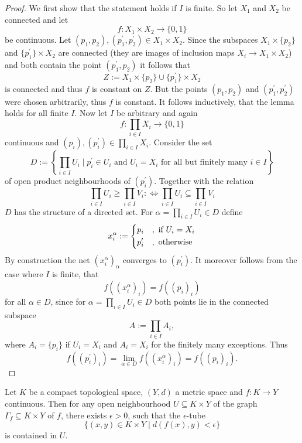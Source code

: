 \begin{proof}
    We first show that the statement holds if $I$ is finite. So let $X_1$ and $X_2$ be connected and let 
    \[
    f \colon X_1 \times X_2 \to \{0,1\}
    \]
    be continuous. Let $(p_1,p_2), (p_1^\prime,p_2^\prime) \in X_1 \times X_2$. Since the subspaces $X_1 \times \{p_2\}$ and $\{p_1^\prime\} \times X_2$ are connected (they are images of inclusion maps $X_i \to X_1 \times X_2$) and both contain the point $(p_1^\prime,p_2)$ it follows that
    \[
    Z:= X_1 \times \{p_2\} \cup \{p_1^\prime\} \times X_2
    \]
    is connected and thus $f$ is constant on $Z$. But the points $(p_1,p_2)$ and $(p_1^\prime,p_2^\prime)$ were chosen arbitrarily, thus $f$ is constant. It follows inductively, that the lemma holds for all finite $I$. Now let $I$ be arbitrary and again 
    \[
    f \colon \prod_{i \in I} X_i \to \{0,1\}
    \]
    continuous and $(p_i),(p_i^\prime) \in \prod_{i \in I} X_i$. Consider the set 
    \[
    D := \left\{\prod_{i \in I} U_i \mid p_i^\prime \in U_i \text{ and }U_i = X_i \text{ for all but finitely many } i \in I\right\}
    \]
    of open product neighbourhoods of $(p_i^\prime)$. Together with the relation 
    \[
    \prod_{i \in I} U_i \geq \prod_{i \in I} V_i :\Leftrightarrow \prod_{i \in I} U_i \subseteq \prod_{i \in I} V_i 
    \]
    $D$ has the structure of a directed set. For $\alpha =  \prod_{i \in I} U_i \in D$ define 
    \[
    x_i^\alpha := \begin{dcases}
        p_i &, \text{ if } U_i = X_i\\
        p_i^\prime &, \text{ otherwise}
    \end{dcases}
    \]
    By construction the net $(x_i^\alpha)_\alpha$ converges to $(p_i^\prime)$. It moreover follows from the case where $I$ is finite, that 
    \[
    f((x_i^\alpha)_i) = f((p_i)_i)
    \]
    for all $\alpha \in D$, since for $\alpha =  \prod_{i \in I} U_i \in D$ both points lie in the connected subspace 
    \[
    A := \prod_{i \in I} A_i,
    \]
    where $A_i = \{p_i\}$ if $U_i = X_i$ and $A_i = X_i$ for the finitely many exceptions. Thus 
    \[
    f((p_i^\prime)_i) = \lim_{\alpha \in D} f((x_i^\alpha)_i) = f((p_i)_i).
    \] 
\end{proof}

\begin{lemma}
    \label{point_set_topo:lem:tube_lemma}
    Let $K$ be a compact topological space, $(Y,d)$ a metric space and $f \colon K \to Y$ continuous. Then for any open neighbourhood $U \subseteq K \times Y$ of the graph $\Gamma_f \subseteq K \times Y$ of $f$, there exists $\epsilon >0$, such that the $\epsilon$-tube 
    \[
    \{
        (x,y) \in K \times Y \mid d(f(x),y) < \epsilon
    \}
    \]
    is contained in $U$.
\end{lemma}